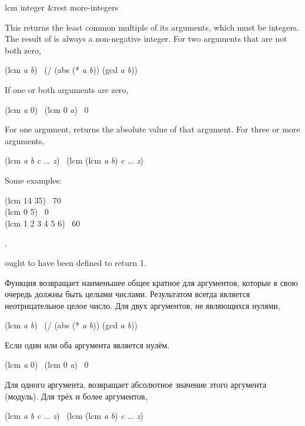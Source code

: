 \begin{defun}[Function]
lcm integer &rest more-integers

This returns the least common multiple of its arguments,
which must be integers.
The result of  is always a non-negative integer.
For two arguments that are not both zero,
\begin{lisp}
(lcm \emph{a} \emph{b}) \EQ\ (/ (abs (* \emph{a} \emph{b})) (gcd \emph{a} \emph{b}))
\end{lisp}
If one or both arguments are zero,
\begin{lisp}
(lcm \emph{a} 0) \EQ\ (lcm 0 \emph{a}) \EQ\ 0
\end{lisp}

For one argument,  returns the absolute value of that argument.
For three or more arguments,
\begin{lisp}
(lcm \emph{a} \emph{b} \emph{c} ... \emph{z}) \EQ\ (lcm (lcm \emph{a} \emph{b}) \emph{c} ... \emph{z})
\end{lisp}

Some examples:
\begin{lisp}
(lcm 14 35) \EV\ 70 \\
(lcm 0 5) \EV\ 0 \\
(lcm 1 2 3 4 5 6) \EV\ 60
\end{lisp}

\begin{lisp}
.  
\end{lisp}

 ought to have been defined to return 1.

Функция возвращает наименьшее общее кратное для аргументов, которые в свою
очередь должны быть целыми числами.
Результатом  всегда является неотрицательное целое число.
Для двух аргументов, не являющихся нулями,
\begin{lisp}
(lcm \emph{a} \emph{b}) \EQ\ (/ (abs (* \emph{a} \emph{b})) (gcd \emph{a} \emph{b}))
\end{lisp}
Если один или оба аргумента является нулём.
\begin{lisp}
(lcm \emph{a} 0) \EQ\ (lcm 0 \emph{a}) \EQ\ 0
\end{lisp}

Для одного аргумента,  возвращает абсолютное значение этого аргумента
(модуль). 
Для трёх и более аргументов,
\begin{lisp}
(lcm \emph{a} \emph{b} \emph{c} ... \emph{z}) \EQ\ (lcm (lcm \emph{a} \emph{b}) \emph{c} ... \emph{z})
\end{lisp}


\end{defun}
